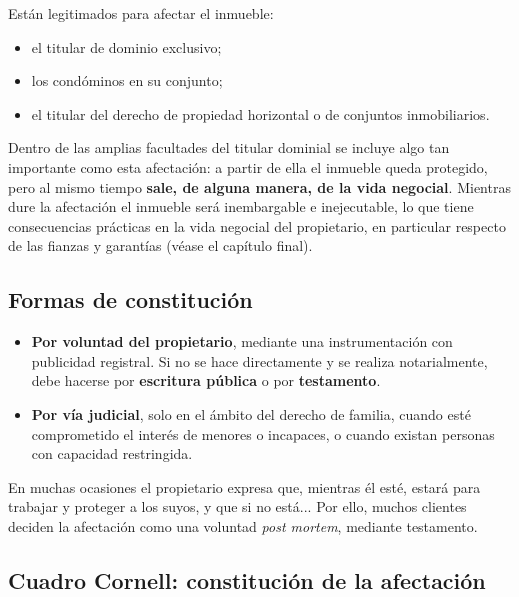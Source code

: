 \documentclass[12pt,oneside]{book}
\begin{document}
Est\'an legitimados para afectar el inmueble:

\begin{itemize}
    \item el titular de dominio exclusivo;
    \item los cond\'ominos en su conjunto;
    \item el titular del derecho de propiedad horizontal o de conjuntos inmobiliarios.
\end{itemize}

Dentro de las amplias facultades del titular dominial se incluye algo tan importante como esta afectaci\'on: a partir de ella el inmueble queda protegido, pero al mismo tiempo \textbf{sale, de alguna manera, de la vida negocial}. Mientras dure la afectaci\'on el inmueble ser\'a inembargable e inejecutable, lo que tiene consecuencias pr\'acticas en la vida negocial del propietario, en particular respecto de las fianzas y garant\'ias (v\'ease el cap\'itulo final).

\subsection{Formas de constituci\'on}

\begin{itemize}
    \item \textbf{Por voluntad del propietario}, mediante una instrumentaci\'on con publicidad registral. Si no se hace directamente y se realiza notarialmente, debe hacerse por \textbf{escritura p\'ublica} o por \textbf{testamento}.
    \item \textbf{Por v\'ia judicial}, solo en el \'ambito del derecho de familia, cuando est\'e comprometido el inter\'es de menores o incapaces, o cuando existan personas con capacidad restringida.
\end{itemize}

\begin{note}
En muchas ocasiones el propietario expresa que, mientras \'el est\'e, estar\'a para trabajar y proteger a los suyos, y que si no est\'a... Por ello, muchos clientes deciden la afectaci\'on como una voluntad \textit{post mortem}, mediante testamento.
\end{note}

\subsection*{Cuadro Cornell: constituci\'on de la afectaci\'on}
\end{document}
